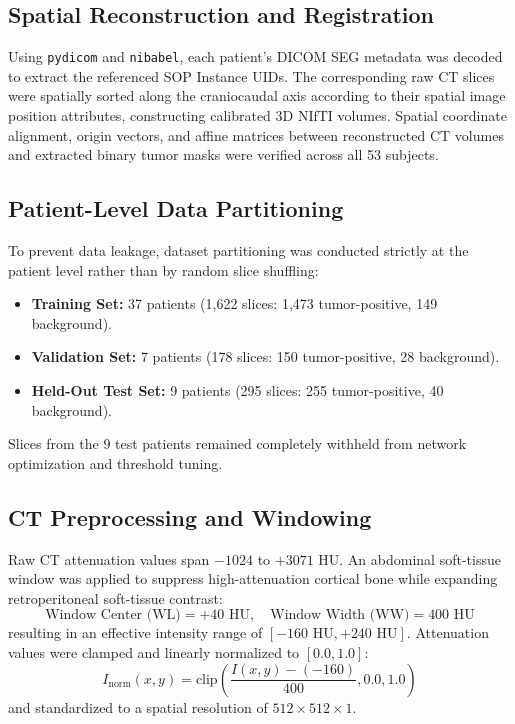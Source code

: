 \documentclass[conference]{IEEEtran}
\begin{document}
\subsection{Spatial Reconstruction and Registration}
Using \texttt{pydicom} and \texttt{nibabel}, each patient's DICOM SEG metadata was decoded to extract the referenced SOP Instance UIDs. The corresponding raw CT slices were spatially sorted along the craniocaudal axis according to their spatial image position attributes, constructing calibrated 3D NIfTI volumes. Spatial coordinate alignment, origin vectors, and affine matrices between reconstructed CT volumes and extracted binary tumor masks were verified across all 53 subjects.

\subsection{Patient-Level Data Partitioning}
To prevent data leakage, dataset partitioning was conducted strictly at the patient level rather than by random slice shuffling:
\begin{itemize}
    \item \textbf{Training Set:} 37 patients (1,622 slices: 1,473 tumor-positive, 149 background).
    \item \textbf{Validation Set:} 7 patients (178 slices: 150 tumor-positive, 28 background).
    \item \textbf{Held-Out Test Set:} 9 patients (295 slices: 255 tumor-positive, 40 background).
\end{itemize}
Slices from the 9 test patients remained completely withheld from network optimization and threshold tuning.

\subsection{CT Preprocessing and Windowing}
Raw CT attenuation values span $-1024$ to $+3071$ HU. An abdominal soft-tissue window was applied to suppress high-attenuation cortical bone while expanding retroperitoneal soft-tissue contrast:
\begin{equation}
    \text{Window Center (WL)} = +40\text{ HU}, \quad \text{Window Width (WW)} = 400\text{ HU}
\end{equation}
resulting in an effective intensity range of $[-160\text{ HU}, +240\text{ HU}]$. Attenuation values were clamped and linearly normalized to $[0.0, 1.0]$:
\begin{equation}
    I_{\text{norm}}(x,y) = \text{clip}\left(\frac{I(x,y) - (-160)}{400}, 0.0, 1.0\right)
\end{equation}
and standardized to a spatial resolution of $512 \times 512 \times 1$.
\end{document}
